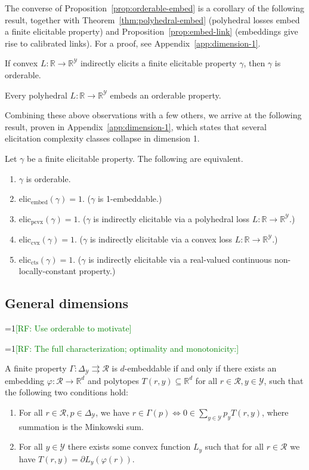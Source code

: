 \documentclass[11pt]{colt2019}
\newcommand{\Comments}{1}
\newcommand{\mynote}[2]{\ifnum\Comments=1\textcolor{#1}{#2}\fi}
\newcommand{\raf}[1]{\mynote{green}{[RF: #1]}}
\newcommand{\reals}{\mathbb{R}}
\newcommand{\eliccts}{\mathrm{elic}_\mathrm{cts}}
\newcommand{\eliccvx}{\mathrm{elic}_\mathrm{cvx}}
\newcommand{\elicpoly}{\mathrm{elic}_\mathrm{pcvx}}
\newcommand{\elicembed}{\mathrm{elic}_\mathrm{embed}}
\newcommand{\simplex}{\Delta_\Y}
\newcommand{\R}{\mathcal{R}}
\newcommand{\Y}{\mathcal{Y}}
\newcommand{\toto}{\rightrightarrows}
\begin{document}
The converse of Proposition~\ref{prop:orderable-embed} is a corollary of the following result, together with Theorem~\ref{thm:polyhedral-embed} (polyhedral losses embed a finite elicitable property) and Proposition~\ref{prop:embed-link} (embeddings give rise to calibrated links).
For a proof, see Appendix~\ref{app:dimension-1}.
\begin{proposition}\label{prop:indirect-orderable}
  If convex $L : \reals \to \reals^\Y$ indirectly elicits a finite elicitable property $\gamma$, then $\gamma$ is orderable.
\end{proposition}

\begin{corollary}\label{cor:embed-orderable}
  Every polyhedral $L : \reals \to \reals^\Y$ embeds an orderable property.
\end{corollary}


Combining these above observations with a few others, we arrive at the following result, proven in Appendix~\ref{app:dimension-1}, which states that several elicitation complexity classes collapse in dimension 1.
\begin{theorem}
  Let $\gamma$ be a finite elicitable property.
  The following are equivalent.
  \begin{enumerate}
  \item $\gamma$ is orderable.
  \item $\elicembed(\gamma)=1$. ($\gamma$ is 1-embeddable.)
  \item $\elicpoly(\gamma)=1$. ($\gamma$ is indirectly elicitable via a polyhedral loss $L:\reals\to\reals^\Y$.)
  \item $\eliccvx(\gamma)=1$. ($\gamma$ is indirectly elicitable via a convex loss $L:\reals\to\reals^\Y$.)
  \item $\eliccts(\gamma)=1$. ($\gamma$ is indirectly elicitable via a real-valued continuous non-locally-constant property.)
  \end{enumerate}
\end{theorem}

\subsection{General dimensions}

\raf{Use orderable to motivate}

\raf{The full characterization; optimality and monotonicity:}
\begin{theorem}
  A finite property $\Gamma:\simplex\toto\R$ is $d$-embeddable if and only if there exists an embedding $\varphi: \R \to \reals^d$ and polytopes $T(r,y) \subseteq \reals^d$ for all $r\in\R, y\in\Y$, such that the following two conditions hold:
  \begin{enumerate}
  \item For all $r\in\R, p\in\simplex$, we have $r\in \Gamma(p) \iff 0 \in \sum_{y\in\Y} p_y T(r,y)$, where summation is the Minkowski sum.
  \item For all $y\in\Y$ there exists some convex function $L_y$ such that for all $r\in\R$ we have $T(r,y) = \partial L_y(\varphi(r))$.
  \end{enumerate}
\end{theorem}
\end{document}
